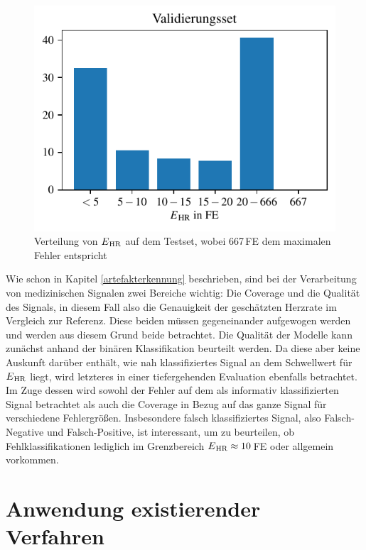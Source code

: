 \begin{figure}[h]
	\centering
	\includegraphics{pic/mlp-statistical-testset.pdf}
	\caption[Verteilung von $E\textsubscript{HR}$ auf dem Testset]{Verteilung von $E\textsubscript{HR}$ auf dem Testset, wobei 667\,\si{FE} dem maximalen Fehler entspricht}
	\label{fig:validation-set}
\end{figure}


Wie schon in Kapitel \ref{artefakterkennung} beschrieben, sind bei der Verarbeitung von medizinischen Signalen zwei Bereiche wichtig: Die Coverage und die Qualität des Signals, in diesem Fall also die Genauigkeit der geschätzten Herzrate im Vergleich zur Referenz. Diese beiden müssen gegeneinander aufgewogen werden und werden aus diesem Grund beide betrachtet. Die Qualität der Modelle kann zunächst anhand der binären Klassifikation beurteilt werden. Da diese aber keine Auskunft darüber enthält, wie nah klassifiziertes Signal an dem Schwellwert für $E\textsubscript{HR}$ liegt, wird letzteres in einer tiefergehenden Evaluation ebenfalls betrachtet. Im Zuge dessen wird sowohl der Fehler auf dem als informativ klassifizierten Signal betrachtet als auch die Coverage in Bezug auf das ganze Signal für verschiedene Fehlergrößen. Insbesondere falsch klassifiziertes Signal, also Falsch-Negative und Falsch-Positive, ist interessant, um zu beurteilen, ob Fehlklassifikationen lediglich im Grenzbereich $E\textsubscript{HR} \approx 10$\,\si{FE} oder allgemein vorkommen.

\section{Anwendung existierender Verfahren}

